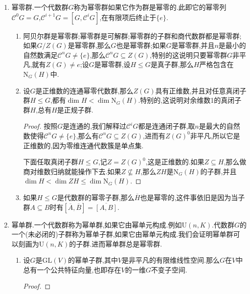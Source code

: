 \begin{enumerate}
\begin{enumerate}[(1)]
\begin{proof}
    		我们有子群列$H=H_0\supseteq H_1\supseteq\cdots\supseteq H_n=\{e\}$,满足$[H_i,H_i]\subseteq H_{i+1}$.于是有$[\overline{H_i},\overline{H_i}]\subseteq\overline{H}_{i+1}$.于是子群列$\overline{H}=\overline{H_0}\supseteq\cdots\supseteq\overline{H_n}=\{e\}$保证$\overline{H}$是可解群.
    	\end{proof}
    \end{enumerate}
    \item 幂零群.一个代数群$G$称为幂零群如果它作为群是幂零的.此即它的幂零列$\mathscr{C}^0G=G$,$\mathscr{C}^{i+1}G=[G,\mathscr{C}^iG]$,在有限项后终止于$\{e\}$.
    \begin{enumerate}[(1)]
    	\item 阿贝尔群是幂零群;幂零群是可解群;幂零群的子群和商代数群都是幂零群;如果$G/Z(G)$是幂零群,那么$G$也是幂零群;如果$G$是幂零群,并且$n$是最小的自然数满足$\mathscr{C}^nG\not=\{e\}$,那么$\mathscr{C}^nG\subseteq Z(G)$,特别的这说明只要幂零群$G$非平凡,就有$Z(G)\not=e$;设$G$是幂零群,设$H\le G$是真子群,那么$H$严格包含在$\mathrm{N}_G(H)$中.
    	\item 设$G$是正维数的连通幂零代数群,那么$Z(G)$具有正维数,并且对任意真闭子群$H\le G$,都有$\dim H<\dim\mathrm{N}_G(H)$.特别的,这说明对余维数1的真闭子群$H$,总有$H$是正规子群.
    	\begin{proof}
    		
    		按照$G$是连通的,我们解释过$\mathscr{C}^iG$都是连通闭子群,取$n$是最大的自然数使得$\mathscr{C}^nG\not=\{e\}$,那么有$\mathscr{C}^nG\subseteq Z(G)$,进而有$Z(G)^0$非平凡,所以它是正维数的,因为零维连通代数簇是单点集.
    		
    		\qquad
    		
    		下面任取真闭子群$H\le G$,记$Z=Z(G)^0$,这是正维数的.如果$Z\subseteq H$,那么做商对维数归纳就能操作下去.如果$Z\not\subseteq H$,那么$ZH$是$\mathrm{N}_G(H)$的子群,并且$\dim H<\dim ZH\le\dim\mathrm{N}_G(H)$.
    	\end{proof}
        \item 如果$H\le G$是代数群的幂零子群,那么$\overline{H}$也是幂零的,这件事依旧是因为当子群$A\subseteq B$时有$[\overline{A},\overline{B}]=\overline{[A,B]}$.
    \end{enumerate}
    \item 幂单群.一个代数群称为幂单群,如果它由幂单元构成.例如$\mathrm{U}(n,K)$.代数群$G$的一个(未必闭的)子群称为幂单子群,如果它由幂单元构成.我们会证明幂单群可以刻画为$\mathrm{U}(n,K)$的子群.进而幂单群总是幂零群.
    \begin{enumerate}[(1)]
    	\item 设$G$是$\mathrm{GL}(V)$的幂单子群,其中$V$是非平凡的有限维线性空间.那么$G$在$V$中总有一个公共特征向量,也即存在$V$的一维$G$不变子空间.
    	\begin{proof}
    		

\end{proof}
\end{enumerate}
\end{enumerate}
